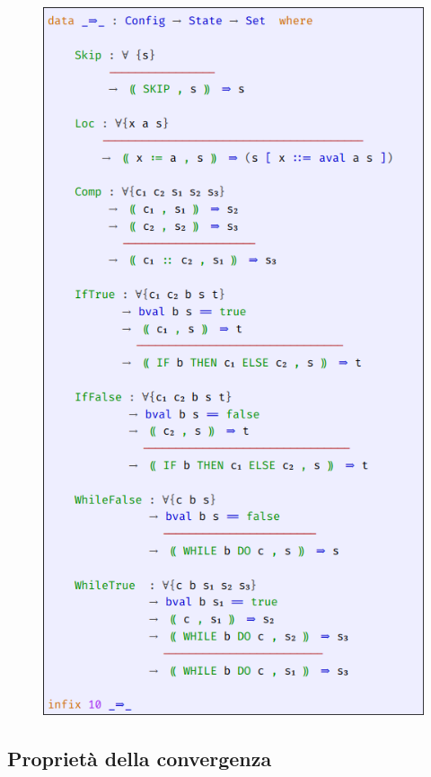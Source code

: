 \begin{figure}[h]
  \centering
  \includegraphics[scale=0.55]{images/IMP/Rel.png}
\end{figure}

\pagebreak

\subsection{Proprietà della convergenza}

